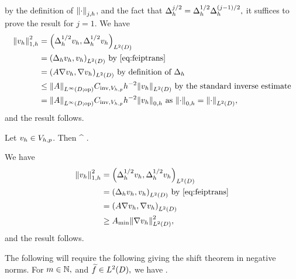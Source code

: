 by the definition of $\Njh{\cdot}$, and the fact that $\Delta_{h}^{j/2} = \Delta_{h}^{1/2}\Delta_{h}^{(j-1)/2},$ it suffices to prove the result for $j=1$. We have
\begin{align*}
\Noh{\vh}^2 &= \IPLtD{\Deltahh \vh}{\Deltahh \vh}\\
&= \IPLtD{\Deltah \vh}{\vh} \text{ by \cref{eq:feiptrans}}\\
&= \IPLtD{A \grad \vh}{\grad \vh} \text{ by definition of } \Deltah\\
&\leq \NLiDop{A} \CinvVhp h^{-2} \NLtD{\vh} \text{ by the standard inverse estimate}\\
&= \NLiDop{A} \CinvVhp h^{-2} \Nzh{\vh} \text{ as } \Nzh{\cdot} = \NLtD{\cdot},
\end{align*}
and the result follows.
\epf

\label{lem:h1contdisc}
Let $v_{h} \in V_{h,p}$. Then
\beqs
\SNHoD{\vh} \leq \Amin^{\half} \Noh{\vh}.
\eeqs
\ele

We have
\begin{align*}
\Noh{\vh}^2 &= \IPLtD{\Deltahh \vh}{\Deltahh \vh}\\
&= \IPLtD{\Deltah \vh}{\vh} \text{ by \cref{eq:feiptrans}}\\
&= \IPLtD{A \grad \vh}{\grad \vh}\\
&\geq \Amin \NLtD{\grad \vh}^2,
\end{align*}
and the result follows.
\epf

The following  will require the following  giving the shift theorem in negative norms.
\label{lem:shiftnegative}
For $m \in \mathbb N,$ and $\ftilde \in \LtD,$ we have
\beqs
\NHmmD{\DeltaAI\mleft(\ftilde\mright)} \leq \CAm \NHmmmtD{\ftilde}.
\eeqs
\ele

